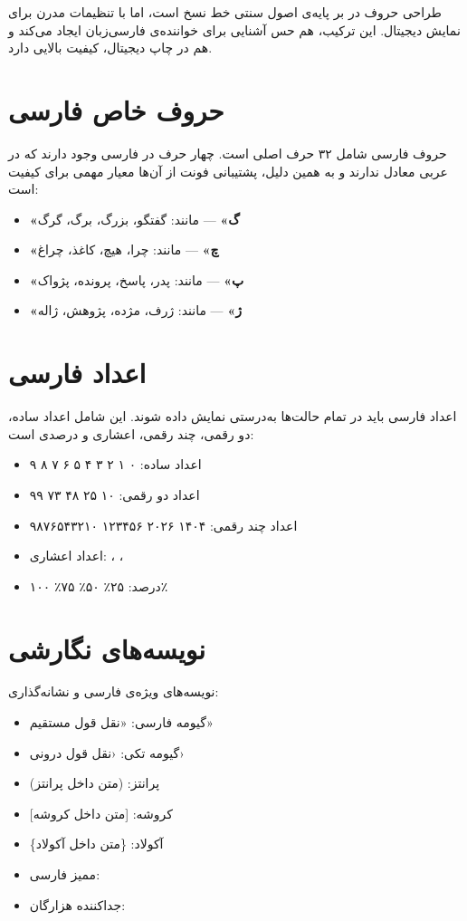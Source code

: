 \documentclass{matinbook}
\begin{document}
طراحی حروف در  بر پایه‌ی اصول سنتی خط نسخ است،
اما با تنظیمات مدرن برای نمایش دیجیتال. این ترکیب، هم حس
آشنایی برای خواننده‌ی فارسی‌زبان ایجاد می‌کند و هم در چاپ
دیجیتال، کیفیت بالایی دارد.

\section{حروف خاص فارسی}
\label{sec:font-persian-special}

حروف فارسی شامل ۳۲ حرف اصلی است. چهار حرف در فارسی وجود دارند
که در عربی معادل ندارند و به همین دلیل، پشتیبانی فونت از آن‌ها
معیار مهمی برای کیفیت است:

\begin{itemize}
    \item \textbf{«گ»} — مانند: گفتگو، بزرگ، برگ، گرگ
    \item \textbf{«چ»} — مانند: چرا، هیچ، کاغذ، چراغ
    \item \textbf{«پ»} — مانند: پدر، پاسخ، پرونده، پژواک
    \item \textbf{«ژ»} — مانند: ژرف، مژده، پژوهش، ژاله
\end{itemize}

\section{اعداد فارسی}
\label{sec:font-persian-numbers}

اعداد فارسی باید در تمام حالت‌ها به‌درستی نمایش داده شوند.
این شامل اعداد ساده، دو رقمی، چند رقمی، اعشاری و درصدی است:

\begin{itemize}
    \item اعداد ساده: ۰ ۱ ۲ ۳ ۴ ۵ ۶ ۷ ۸ ۹
    \item اعداد دو رقمی: ۱۰ ۲۵ ۴۸ ۷۳ ۹۹
    \item اعداد چند رقمی: ۱۴۰۴ ۲۰۲۶ ۱۲۳۴۵۶ ۹۸۷۶۵۴۳۲۱۰
    \item اعداد اعشاری: ، ، 
    \item درصد: ۲۵٪ ۵۰٪ ۷۵٪ ۱۰۰٪
\end{itemize}

\section{نویسه‌های نگارشی}
\label{sec:font-persian-punctuation}

نویسه‌های ویژه‌ی فارسی و نشانه‌گذاری:

\begin{itemize}
    \item گیومه فارسی: «نقل قول مستقیم»
    \item گیومه تکی: ‹نقل قول درونی›
    \item پرانتز: (متن داخل پرانتز)
    \item کروشه: [متن داخل کروشه]
    \item آکولاد: \{متن داخل آکولاد\}
    \item ممیز فارسی: 
    \item جداکننده هزارگان: 
\end{itemize}
\end{document}
